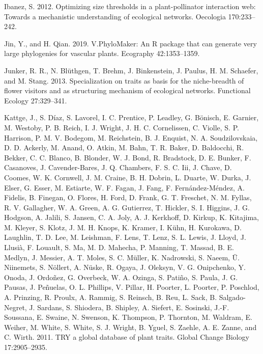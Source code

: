 \documentclass[12pt,a4paper,]{article}
\begin{document}
\hypertarget{ref-ibanez2012}{}
Ibanez, S. 2012. Optimizing size thresholds in a plant-pollinator
interaction web: Towards a mechanistic understanding of ecological
networks. Oecologia 170:233--242.

\hypertarget{ref-jin2019}{}
Jin, Y., and H. Qian. 2019. V.PhyloMaker: An R package that can generate
very large phylogenies for vascular plants. Ecography 42:1353--1359.

\hypertarget{ref-junker2013}{}
Junker, R. R., N. Blüthgen, T. Brehm, J. Binkenstein, J. Paulus, H. M.
Schaefer, and M. Stang. 2013. Specialization on traits as basis for the
niche-breadth of flower visitors and as structuring mechanism of
ecological networks. Functional Ecology 27:329--341.

\hypertarget{ref-kattge2011}{}
Kattge, J., S. Díaz, S. Lavorel, I. C. Prentice, P. Leadley, G. Bönisch,
E. Garnier, M. Westoby, P. B. Reich, I. J. Wright, J. H. C. Cornelissen,
C. Violle, S. P. Harrison, P. M. V. Bodegom, M. Reichstein, B. J.
Enquist, N. A. Soudzilovskaia, D. D. Ackerly, M. Anand, O. Atkin, M.
Bahn, T. R. Baker, D. Baldocchi, R. Bekker, C. C. Blanco, B. Blonder, W.
J. Bond, R. Bradstock, D. E. Bunker, F. Casanoves, J. Cavender-Bares, J.
Q. Chambers, F. S. C. Iii, J. Chave, D. Coomes, W. K. Cornwell, J. M.
Craine, B. H. Dobrin, L. Duarte, W. Durka, J. Elser, G. Esser, M.
Estiarte, W. F. Fagan, J. Fang, F. Fernández-Méndez, A. Fidelis, B.
Finegan, O. Flores, H. Ford, D. Frank, G. T. Freschet, N. M. Fyllas, R.
V. Gallagher, W. A. Green, A. G. Gutierrez, T. Hickler, S. I. Higgins,
J. G. Hodgson, A. Jalili, S. Jansen, C. A. Joly, A. J. Kerkhoff, D.
Kirkup, K. Kitajima, M. Kleyer, S. Klotz, J. M. H. Knops, K. Kramer, I.
Kühn, H. Kurokawa, D. Laughlin, T. D. Lee, M. Leishman, F. Lens, T.
Lenz, S. L. Lewis, J. Lloyd, J. Llusià, F. Louault, S. Ma, M. D.
Mahecha, P. Manning, T. Massad, B. E. Medlyn, J. Messier, A. T. Moles,
S. C. Müller, K. Nadrowski, S. Naeem, Ü. Niinemets, S. Nöllert, A.
Nüske, R. Ogaya, J. Oleksyn, V. G. Onipchenko, Y. Onoda, J. Ordoñez, G.
Overbeck, W. A. Ozinga, S. Patiño, S. Paula, J. G. Pausas, J. Peñuelas,
O. L. Phillips, V. Pillar, H. Poorter, L. Poorter, P. Poschlod, A.
Prinzing, R. Proulx, A. Rammig, S. Reinsch, B. Reu, L. Sack, B.
Salgado-Negret, J. Sardans, S. Shiodera, B. Shipley, A. Siefert, E.
Sosinski, J.-F. Soussana, E. Swaine, N. Swenson, K. Thompson, P.
Thornton, M. Waldram, E. Weiher, M. White, S. White, S. J. Wright, B.
Yguel, S. Zaehle, A. E. Zanne, and C. Wirth. 2011. TRY a global database
of plant traits. Global Change Biology 17:2905--2935.
\end{document}
